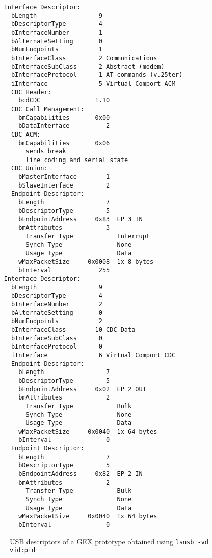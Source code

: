 \begin{minipage}[t]{0.5\textwidth}\scriptsize
\begin{verbatim}
    Interface Descriptor:
      bLength                 9
      bDescriptorType         4
      bInterfaceNumber        1
      bAlternateSetting       0
      bNumEndpoints           1
      bInterfaceClass         2 Communications
      bInterfaceSubClass      2 Abstract (modem)
      bInterfaceProtocol      1 AT-commands (v.25ter)
      iInterface              5 Virtual Comport ACM
      CDC Header:
        bcdCDC               1.10
      CDC Call Management:
        bmCapabilities       0x00
        bDataInterface          2
      CDC ACM:
        bmCapabilities       0x06
          sends break
          line coding and serial state
      CDC Union:
        bMasterInterface        1
        bSlaveInterface         2 
      Endpoint Descriptor:
        bLength                 7
        bDescriptorType         5
        bEndpointAddress     0x83  EP 3 IN
        bmAttributes            3
          Transfer Type            Interrupt
          Synch Type               None
          Usage Type               Data
        wMaxPacketSize     0x0008  1x 8 bytes
        bInterval             255
    Interface Descriptor:
      bLength                 9
      bDescriptorType         4
      bInterfaceNumber        2
      bAlternateSetting       0
      bNumEndpoints           2
      bInterfaceClass        10 CDC Data
      bInterfaceSubClass      0 
      bInterfaceProtocol      0 
      iInterface              6 Virtual Comport CDC
      Endpoint Descriptor:
        bLength                 7
        bDescriptorType         5
        bEndpointAddress     0x02  EP 2 OUT
        bmAttributes            2
          Transfer Type            Bulk
          Synch Type               None
          Usage Type               Data
        wMaxPacketSize     0x0040  1x 64 bytes
        bInterval               0
      Endpoint Descriptor:
        bLength                 7
        bDescriptorType         5
        bEndpointAddress     0x82  EP 2 IN
        bmAttributes            2
          Transfer Type            Bulk
          Synch Type               None
          Usage Type               Data
        wMaxPacketSize     0x0040  1x 64 bytes
        bInterval               0
\end{verbatim}
\end{minipage}\vspace{-1em}
\begin{figure}[H]
	\cprotect\caption{USB descriptors of a GEX prototype obtained using \verb|lsusb -vd vid:pid|}
\end{figure}
